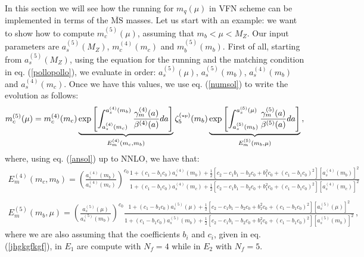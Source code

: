 \documentclass[10pt,a4paper]{article}
\begin{document}
In this section we will see how the running for $m_q(\mu)$ in VFN scheme can be implemented in terms of the $\overline{\mbox{MS}}$ masses. Let us start with an example: we want to show how to compute $m_c^{(5)}(\mu)$, assuming that $m_b<\mu<M_Z$. Our input parameters are $a_s^{(5)}(M_Z)$, $m_c^{(4)}(m_c)$ and $m_b^{(5)}(m_b)$. First of all, starting from $a_s^{(5)}(M_Z)$, using the equation for the running and the matching condition in eq. (\ref{pollopollo}), we evaluate in order: $a_s^{(5)}(\mu)$, $a_s^{(5)}(m_b)$, $a_s^{(4)}(m_b)$ and $a_s^{(4)}(m_c)$. Once we have this values, we use eq. (\ref{numsol}) to write the evolution as follows:
\begin{equation}
m_c^{(5)}(\mu) = m_c^{(4)}(m_c)\underbrace{\exp\left[\int_{a_s^{(4)}(m_c)}^{a_s^{(4)}(m_b)}\frac{\gamma_m^{(4)}(a)}{\beta^{(4)}(a)}da\right]}_{E_m^{(4)}(m_c,m_b)}\zeta_5^{(\mbox{\tiny up})}(m_b)\underbrace{\exp\left[\int_{a_s^{(5)}(m_b)}^{a_s^{(5)}(\mu)}\frac{\gamma_m^{(5)}(a)}{\beta^{(5)}(a)}da\right]}_{E_m^{(5)}(m_b,\mu)}\,,
\end{equation}
where, using eq. (\ref{ansol}) up to NNLO, we have that:
\begin{equation}
\begin{array}{l}
\displaystyle E_m^{(4)}(m_c,m_b)=\left(\frac{a_s^{(4)}(m_b)}{a_s^{(4)}(m_c)}\right)^{c_0}\frac{1+(c_1-b_1c_0)a_s^{(4)}(m_b)+\frac12[c_2-c_1b_1-b_2c_0+b_1^2c_0+(c_1-b_1c_0)^2][a_s^{(4)}(m_b)]^2}{1+(c_1-b_1c_0)a_s^{(4)}(m_c)+\frac12[c_2-c_1b_1-b_2c_0+b_1^2c_0+(c_1-b_1c_0)^2][a_s^{(4)}(m_c)]^2}\\
\\
\displaystyle E_m^{(5)}(m_b,\mu)=\left(\frac{a_s^{(5)}(\mu)}{a_s^{(5)}(m_b)}\right)^{c_0}\frac{1+(c_1-b_1c_0)a_s^{(5)}(\mu)+\frac12[c_2-c_1b_1-b_2c_0+b_1^2c_0+(c_1-b_1c_0)^2][a_s^{(5)}(\mu)]^2}{1+(c_1-b_1c_0)a_s^{(5)}(m_b)+\frac12[c_2-c_1b_1-b_2c_0+b_1^2c_0+(c_1-b_1c_0)^2][a_s^{(5)}(m_b)]^2}\,,
\end{array}
\end{equation}
where we are also assuming that the coefficients $b_i$ and $c_i$, given in eq. (\ref{jhgkgfkgf}), in $E_1$ are compute with $N_f=4$ while in $E_2$ with $N_f=5$.
\end{document}
